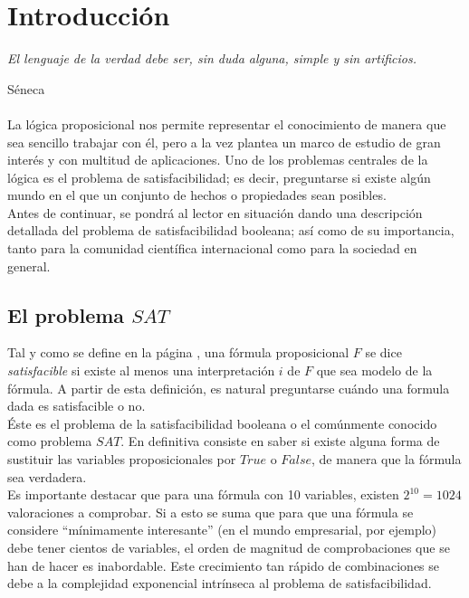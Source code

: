 \chapter*{Introducción}


\hfil \textit{El lenguaje de la verdad debe ser, sin duda alguna, simple y sin artificios.}

\hfil \hfil \hfil \hfil \hfil \hfil Séneca\\\\


La lógica proposicional nos permite representar el conocimiento de manera que sea sencillo trabajar con él, pero a la vez plantea un marco de estudio de gran interés y con multitud de aplicaciones. Uno de los problemas centrales de la lógica es el problema de satisfacibilidad; es decir, preguntarse si existe algún mundo en el que un conjunto de hechos o propiedades sean posibles.\\

Antes de continuar, se pondrá al lector en situación dando una descripción detallada del problema de satisfacibilidad booleana; así como de su importancia, tanto para la comunidad científica internacional como para la sociedad en general.

\section*{El problema $SAT$}

Tal y como se define en la página \pageref{def:sat}, una fórmula proposicional $F$ se dice \textit{satisfacible} si existe al menos una interpretación $i$ de $F$ que sea modelo de la fórmula. A partir de esta definición, es natural preguntarse cuándo una formula dada es satisfacible o no. \\ 

Éste es el problema de la satisfacibilidad booleana o el comúnmente conocido como problema $SAT$. En definitiva consiste en saber si existe alguna forma de sustituir las variables proposicionales por $True$ o $False$, de manera que la fórmula sea verdadera. \\

Es importante destacar que para una fórmula con 10 variables, existen $2^{10} = 1024$ valoraciones a comprobar. Si a esto se suma que para que una fórmula se considere ``mínimamente interesante'' (en el mundo empresarial, por ejemplo) debe tener cientos de variables, el orden de magnitud de comprobaciones que se han de hacer es inabordable. Este crecimiento tan rápido de combinaciones se debe a la complejidad exponencial intrínseca al problema de satisfacibilidad. \\

